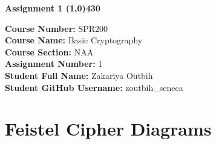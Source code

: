 \documentclass{article}
\begin{document}
\begin{center}
 \LARGE\bfseries Assignment 1 
 \line(1,0){430}
\end{center}

\begin{center}
 \textbf{Course Number:} SPR200 \\
 \textbf{Course Name:} Basic Cryptography \\
 \textbf{Course Section:} NAA \\
 \textbf{Assignment Number:} 1 \\
 \textbf{Student Full Name:} Zakariya Outbih \\
 \textbf{Student GitHub Username:} zoutbih\_seneca
\end{center}

\section*{Feistel Cipher Diagrams}
\end{document}
